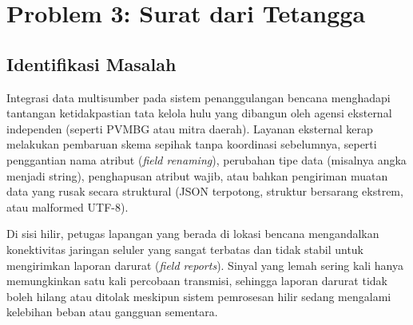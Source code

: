 \clearpage
\section{Problem 3: Surat dari Tetangga}
\label{sec:problem_3}

\subsection{Identifikasi Masalah}
Integrasi data multisumber pada sistem penanggulangan bencana menghadapi tantangan ketidakpastian tata kelola hulu yang dibangun oleh agensi eksternal independen (seperti PVMBG atau mitra daerah). Layanan eksternal kerap melakukan pembaruan skema sepihak tanpa koordinasi sebelumnya, seperti penggantian nama atribut (\textit{field renaming}), perubahan tipe data (misalnya angka menjadi string), penghapusan atribut wajib, atau bahkan pengiriman muatan data yang rusak secara struktural (JSON terpotong, struktur bersarang ekstrem, atau malformed UTF-8).

\vspace{1em}

\noindent Di sisi hilir, petugas lapangan yang berada di lokasi bencana mengandalkan konektivitas jaringan seluler yang sangat terbatas dan tidak stabil untuk mengirimkan laporan darurat (\textit{field reports}). Sinyal yang lemah sering kali hanya memungkinkan satu kali percobaan transmisi, sehingga laporan darurat tidak boleh hilang atau ditolak meskipun sistem pemrosesan hilir sedang mengalami kelebihan beban atau gangguan sementara.

\vspace{1em}

